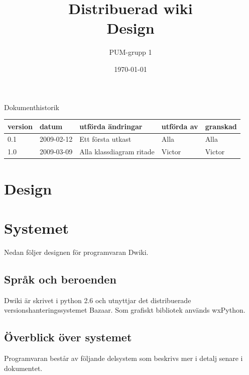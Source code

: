 

\ifpdf
\else
\fi

\title{Distribuerad wiki \\ Design}
\author{PUM-grupp 1}
\date{\today}



\maketitle

\thispagestyle{empty}

\newpage

{\centering \Large{Dokumenthistorik\\}}

\vspace{10pt}
\begin{tabularx}{\textwidth}{ |l|l|X|l|l| }
  \hline
    \textbf{version} & \textbf{datum} & \textbf{utförda ändringar} & \textbf{utförda av} & \textbf{granskad} \\
	\hline 
  0.1 & 2009-02-12 &  Ett första utkast  & Alla & Alla   \\
	\hline	
  1.0 & 2009-03-09 & Alla klassdiagram ritade & Victor & Victor\\

  \hline
\end{tabularx}

\newpage

\setcounter{tocdepth}{2}
\tableofcontents
\newpage

\section{Design}

\section{Systemet}
Nedan följer designen för programvaran Dwiki.
\subsection{Språk och beroenden}
Dwiki är skrivet i python 2.6 och utnyttjar det distribuerade versionshanteringssystemet Bazaar. Som grafiskt bibliotek används wxPython.
\subsection{Överblick över systemet}
Programvaran består av följande delsystem som beskrivs mer i detalj senare i dokumentet.
